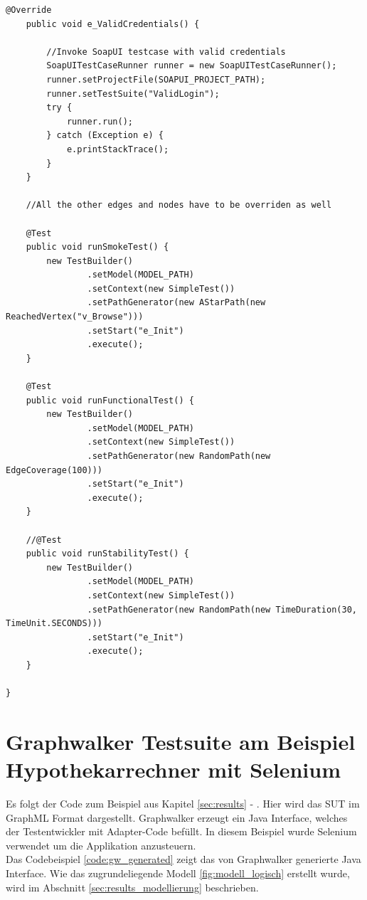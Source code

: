 \begin{lstlisting}[caption=SimpleTest.java, label=code:soap_graphwalker]
    @Override
    public void e_ValidCredentials() {

        //Invoke SoapUI testcase with valid credentials
        SoapUITestCaseRunner runner = new SoapUITestCaseRunner();
        runner.setProjectFile(SOAPUI_PROJECT_PATH);
        runner.setTestSuite("ValidLogin");
        try {
            runner.run();
        } catch (Exception e) {
            e.printStackTrace();
        }
    }

    //All the other edges and nodes have to be overriden as well

    @Test
    public void runSmokeTest() {
        new TestBuilder()
                .setModel(MODEL_PATH)
                .setContext(new SimpleTest())
                .setPathGenerator(new AStarPath(new ReachedVertex("v_Browse")))
                .setStart("e_Init")
                .execute();
    }

    @Test
    public void runFunctionalTest() {
        new TestBuilder()
                .setModel(MODEL_PATH)
                .setContext(new SimpleTest())
                .setPathGenerator(new RandomPath(new EdgeCoverage(100)))
                .setStart("e_Init")
                .execute();
    }

    //@Test
    public void runStabilityTest() {
        new TestBuilder()
                .setModel(MODEL_PATH)
                .setContext(new SimpleTest())
                .setPathGenerator(new RandomPath(new TimeDuration(30, TimeUnit.SECONDS)))
                .setStart("e_Init")
                .execute();
    }

}
\end{lstlisting}


\section{Graphwalker Testsuite am Beispiel Hypothekarrechner mit Selenium}
Es folgt der Code zum Beispiel aus Kapitel \ref{sec:results} - . Hier wird das \Gls{SUT} im GraphML Format dargestellt. Graphwalker erzeugt ein Java Interface, welches der Testentwickler mit Adapter-Code befüllt. In diesem Beispiel wurde Selenium verwendet um die Applikation anzusteuern.\\

Das Codebeispiel \ref{code:gw_generated} zeigt das von Graphwalker generierte Java Interface. Wie das zugrundeliegende Modell \ref{fig:modell_logisch} erstellt wurde, wird im Abschnitt \ref{sec:results_modellierung} beschrieben.\\


